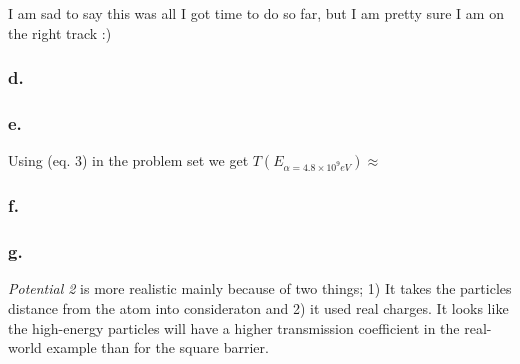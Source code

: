 \documentclass{article}
\begin{document}
I am sad to say this was all I got time to do so far, but I am pretty sure I am on the right track :)

\subsubsection*{d.}



\subsubsection*{e.}

Using (eq. 3) in the problem set we get $T(E_{\alpha = 4.8\times 10^9 eV}) \approx $


\subsubsection*{f.}



\subsubsection*{g.}

\textit{Potential 2} is more realistic mainly because of two things; 1) It takes the particles distance from the atom into consideraton and 2) it used real charges. It looks like the high-energy particles will have a higher transmission coefficient in the real-world example than for the square barrier.
\end{document}
